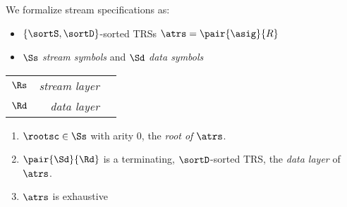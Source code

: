 \documentclass[10pt]{beamer}
\begin{document}
\begin{frame}%
  \frametitle{}%

We formalize stream specifications as:
\begin{itemize}
 \item $\{\sortS,\sortD\}$-sorted %
   TRSs $\atrs = \pair{\asig}{R}$
 \item $\Ss$ \emph{stream symbols} and $\Sd$ \emph{data symbols}
\end{itemize}

\begin{definition}
  \begin{center}
  \renewcommand{\arraystretch}{1.3}
  \begin{tabular}{crc}
    \cline{1-2}
    $\Rs$ & {\em stream layer}\\
      \cline{1-2}
    $\Rd$ & {\em data layer}\\
    \cline{1-2}
  \end{tabular}
  \end{center}
  \begin{enumerate}
    \item $\rootsc \in \Ss$ with arity 0, the \emph{root of\/ $\atrs$}.
    \item\label{def:scs:data}
       $\pair{\Sd}{\Rd}$ is a terminating, $\sortD$-sorted TRS, the \emph{data layer} of\/ $\atrs$.
    \item\label{def:scs:exhaustive}
      $\atrs$ is exhaustive%
  \end{enumerate}
\end{definition}


 
\end{frame}%
\end{document}

